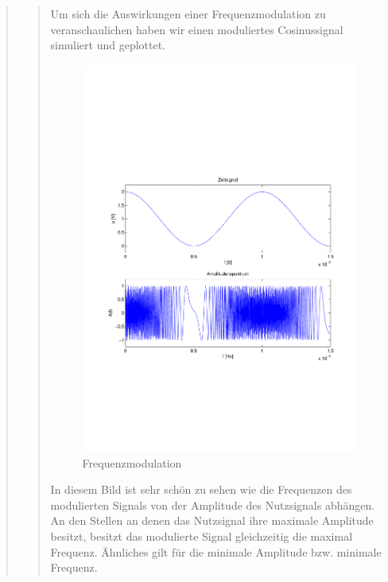 \begin{quote}
\begin{quote}
        Um sich die Auswirkungen einer Frequenzmodulation zu veranschaulichen haben wir einen moduliertes Cosinussignal
        simuliert und geplottet.
        
        \begin{figure}[H]
        \centering
            \includegraphics[scale=0.5, trim = 1.5cm 6.5cm 1cm 8cm, clip]{./Bilder/Frequenzmodulation}
                \caption{Frequenzmodulation}
        \end{figure}
        
        In diesem Bild ist sehr schön zu sehen wie die Frequenzen des modulierten Signals von der Amplitude des
        Nutzsignals abhängen. An den Stellen an denen das Nutzsignal ihre maximale Amplitude besitzt, besitzt das
        modulierte Signal gleichzeitig die maximal Frequenz. Ähnliches gilt für die minimale Amplitude bzw. minimale
        Frequenz.\vspace{1em}
        

\end{quote}
\end{quote}
